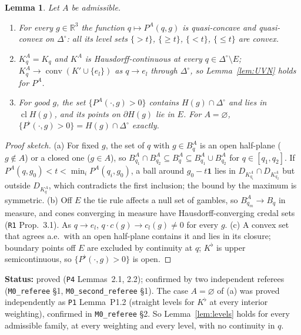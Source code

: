 \documentclass[11pt]{article}
\newtheorem{lemma}[theorem]{Lemma}
\theoremstyle{definition}
\theoremstyle{remark}
\newcommand{\R}{\mathbb R}
\newcommand{\one}{\mathbf 1}
\newcommand{\Di}{\Delta^{\circ}}
\newcommand{\cl}{\operatorname{cl}}
\newcommand{\co}{\operatorname{conv}}
\newcommand{\src}[1]{\texttt{#1}}
\newcommand{\status}[1]{\par\smallskip\noindent\textbf{Status:} #1\par\smallskip}
\begin{document}
\begin{lemma}\label{lem:quasilin}
Let $A$ be admissible.
\begin{enumerate}[leftmargin=*,label=(\alph*)]
\item For every $g\in\R^3$ the function $q\mapsto P^A(q,g)$ is quasi-concave and quasi-convex on $\Di$: all its level sets $\{>t\}$, $\{\ge t\}$, $\{<t\}$, $\{\le t\}$ are convex.
\item $K^A_q=K_q$ and $K^A$ is Hausdorff-continuous at every $q\in\Di\setminus E$; $K^A_q\to\co(K'\cup\{e_l\})$ as $q\to e_l$ through $\Di$, so Lemma~\ref{lem:UVN} holds for $P^A$.
\item For good $g$, the set $\{P^A(\cdot,g)>0\}$ contains $H(g)\cap\Di$ and lies in $\cl H(g)$, and its points on $\partial H(g)$ lie in $E$. For $A=\varnothing$, $\{P^\flat(\cdot,g)>0\}=H(g)\cap\Di$ exactly.
\end{enumerate}
\end{lemma}
\begin{proof}[Proof sketch]
(a) For fixed $g$, the set of $q$ with $g\in B^A_q$ is an open half-plane ($g\notin A$) or a closed one ($g\in A$), so $B^A_{q_1}\cap B^A_{q_2}\subseteq B^A_q\subseteq B^A_{q_1}\cup B^A_{q_2}$ for $q\in[q_1,q_2]$. If $P^A(q,g_0)<t<\min_iP^A(q_i,g_0)$, a ball around $g_0-t\one$ lies in $D_{K^A_{q_1}}\cap D_{K^A_{q_2}}$ but outside $D_{K^A_q}$, which contradicts the first inclusion; the bound by the maximum is symmetric. (b) Off $E$ the tie rule affects a null set of gambles, so $B^A_{q_m}\to B_q$ in measure, and cones converging in measure have Hausdorff-converging credal sets (\src{R1} Prop.~3.1). As $q\to e_l$, $q\cdot c(g)\to c_l(g)\ne0$ for every $g$. (c) A convex set that agrees a.e.\ with an open half-plane contains it and lies in its closure; boundary points off $E$ are excluded by continuity at $q$; $K^\flat$ is upper semicontinuous, so $\{P^\flat(\cdot,g)>0\}$ is open.
\end{proof}
\status{proved (\src{P4} Lemmas~2.1, 2.2); confirmed by two independent referees (\src{M0\_referee} \S1, \src{M0\_second\_referee} \S1). The case $A=\varnothing$ of (a) was proved independently as \src{P1} Lemma~P1.2 (straight levels for $K^\flat$ at every interior weighting), confirmed in \src{M0\_referee} \S2. So Lemma~\ref{lem:levels} holds for every admissible family, at every weighting and every level, with no continuity in $q$.}
\end{document}
